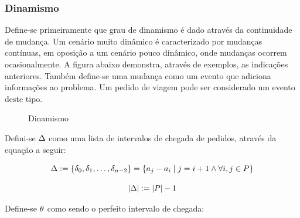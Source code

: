 \documentclass{anpet}
\begin{document}
\subsubsection{Dinamismo}
Define-se primeiramente que grau de dinamismo é dado através da continuidade de mudança. Um cenário muito dinâmico é caracterizado por mudanças contínuas, em oposição a um cenário pouco dinâmico, onde mudanças ocorrem ocasionalmente. A figura abaixo demonstra, através de exemplos, as indicações anteriores. Também define-se uma mudança como um evento que adiciona informações ao problema. Um pedido de viagem pode ser considerado um evento deste tipo.

\begin{figure}[H]
    \begin{center}
        \caption{Dinamismo}
        \label{fig:van_lon_measures_2016_dynamism}
    \end{center} 
\end{figure}

Defini-se $\Delta$ como uma lista de intervalos de chegada de pedidos, através da equação a seguir:

\begin{equation}
    \Delta := \{\delta_0,\delta_1,\ldots, \delta_{n-2}\} = \{a_j - a_i \mid j = i + 1 \wedge \forall i, j \in P\}
    \label{eq:van_lon_measures_2016_intervalsBetweenArrivals}
\end{equation}

\begin{equation}
    |\Delta| := |P| - 1
    \label{eq:van_lon_measures_2016_intervalsBetweenArrivalsSize}
\end{equation}

Define-se $\theta$ como sendo o perfeito intervalo de chegada:
\end{document}
